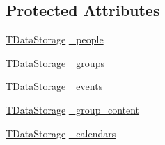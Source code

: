 \subsection*{Protected Attributes}
\begin{DoxyCompactItemize}
\item 
\hyperlink{classTDataStorage}{TDataStorage} \hyperlink{classRDataStorage_a20e069e5b53fe20e2e881bc69e226d3f}{\_\-people}
\item 
\hyperlink{classTDataStorage}{TDataStorage} \hyperlink{classRDataStorage_a52ce62ab5d9c9b28eec00519a47beda0}{\_\-groups}
\item 
\hyperlink{classTDataStorage}{TDataStorage} \hyperlink{classRDataStorage_a384c0874322c03c6bf64a4bfebf39233}{\_\-events}
\item 
\hyperlink{classTDataStorage}{TDataStorage} \hyperlink{classRDataStorage_a628571cad452cbf65b71ec42128a9167}{\_\-group\_\-content}
\item 
\hyperlink{classTDataStorage}{TDataStorage} \hyperlink{classRDataStorage_a0f2ad314330d949cd8cb600298d33eab}{\_\-calendars}
\end{DoxyCompactItemize}


